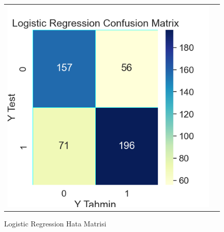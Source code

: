 \documentclass[conference]{IEEEtran}
\begin{document}
\begin{figure}[!h]
	\centering
	\begin{center}
		\begin{tabular}{cc}
			\includegraphics[scale=0.45]{pictures/pic_12.png}&
		\end{tabular}
	\end{center}
	\caption{Logistic Regression Hata Matrisi}
	\label{fig:12}
\end{figure}
\end{document}
